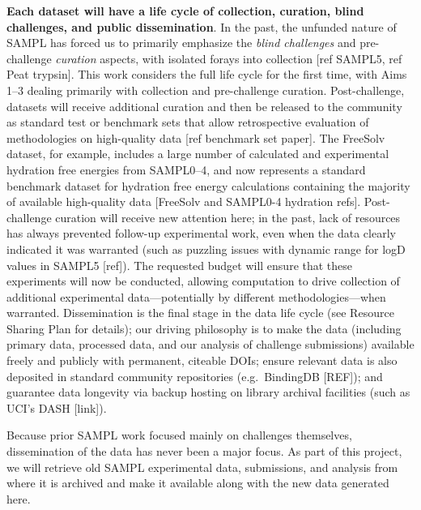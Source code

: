 \documentclass[11pt]{article}
\begin{document}
\textbf{Each dataset will have a life cycle of collection, curation, blind challenges, and public dissemination}.
In the past, the unfunded nature of SAMPL has forced us to primarily emphasize the \emph{blind challenges} and pre-challenge \emph{curation} aspects, with isolated forays into collection [ref SAMPL5, ref Peat trypsin]. 
This work considers the full life cycle for the first time, with Aims 1--3 dealing primarily with collection and pre-challenge curation.
Post-challenge, 
datasets will receive additional curation and then be released to the community as standard test or benchmark sets that allow retrospective evaluation of methodologies on high-quality data [ref benchmark set paper]. 
The FreeSolv dataset, for example, includes a large number of calculated and experimental hydration free energies from SAMPL0--4, and now represents a standard benchmark dataset for hydration free energy calculations containing the majority of available high-quality data [FreeSolv and SAMPL0-4 hydration refs].
Post-challenge curation will receive new attention here; in the past, lack of resources has always prevented follow-up experimental work, even when the data clearly indicated it was warranted (such as puzzling issues with dynamic range for logD values in SAMPL5 [ref]).
The requested budget will ensure that these experiments will now be conducted, allowing computation to drive collection of additional experimental data---potentially by different methodologies---when warranted.
Dissemination is the final stage in the data life cycle (see Resource Sharing Plan for details); our driving philosophy is to make the data (including primary data, processed data, and our analysis of challenge submissions) available freely and publicly with permanent, citeable DOIs; ensure relevant data is also deposited in standard community repositories (e.g.~BindingDB [REF]); and guarantee data longevity via backup hosting on library archival facilities (such as UCI's DASH [link]).

Because prior SAMPL work focused mainly on challenges themselves, dissemination of the data has never been a major focus.
As part of this project, we will retrieve old SAMPL experimental data, submissions, and analysis from where it is archived and make it available along with the new data generated here. 
\end{document}
